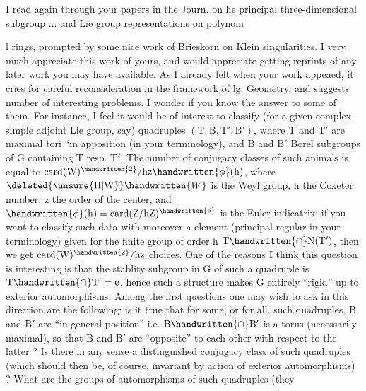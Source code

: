 I read again through your papers in the  Journ. on he principal three-dimensional subgroup ... and Lie group representations on polynoml rings, prompted by some nice work of Brieskorn on Klein singularities. I very much appreciate this work of yours, and would appreciate getting reprints of any later work you may have available. As I already felt when your work appeaed, it cries for careful reconsideration in the framework of lg. Geometry, and suggests number of interesting problems. I wonder if you know the answer to some of them. For instance, I feel it would be of interest to classify (for a given complex simple adjoint Lie group, say) quadruples $(\mathrm{T},\mathrm{B},\mathrm{T}',\mathrm{B}')$, where $\mathrm{T}$ and $\mathrm{T}'$ are maximal tori ``in apposition (in your terminology), and $\mathrm{B}$ and $\mathrm{B}'$ Borel subgroups of $\mathrm{G}$ containing $\mathrm{T}$ resp. $\mathrm{T}'$. The number of conjugacy classes of such animals is equal to $\operatorname{card}(\mathrm{W})^{\handwritten{2}}/\mathrm{hz}\handwritten{\phi}(\mathrm{h})$, where $\deleted{\unsure{\mathrm{H}|\mathrm{W}}}\handwritten{W}$ is the Weyl group, $\mathrm{h}$ the Coxeter number, $\mathrm{z}$ the order of the center, and $\handwritten{\phi}(\mathrm{h})=\operatorname{card}(\underline{\mathrm{Z}}/\mathrm{h}\underline{\mathrm{Z}})^{\handwritten{*}}$ is the Euler indicatrix; if you want to classify such data with moreover a  element (principal regular in your terminology) given for the finite group of order $\mathrm{h}$ $\mathrm{T}\handwritten{\cap}\mathrm{N}(\mathrm{T}')$, then we get $\operatorname{card}(\mathrm{W})^{\handwritten{2}}/\mathrm{hz}$ choices. One of the reasons I think this question is interesting is that the stablity subgroup in $\mathrm{G}$ of such a quadruple is $\mathrm{T}\handwritten{\cap}\mathrm{T}'=\mathrm{e}$,\handwritten{\textsuperscript{*}} hence such a structure makes $\mathrm{G}$ entirely ``rigid'' up to exterior automorphisms. Among the first questions one may wish to ask in this direction are the following: is it true that for some, or for all, such quadruples, $\mathrm{B}$ and $\mathrm{B}'$ are ``in general position'' i.e. $\mathrm{B}\handwritten{\cap}\mathrm{B}'$ is a torus (necessarily maximal), so that $\mathrm{B}$ and $\mathrm{B}'$ are ``opposite'' to each other with respect to the latter ? Is there in any sense a \uline{distinguished} conjugacy class of such quadruples (which should then be, of course, invariant by action of exterior automorphisms) ? What are the groups of automorphisms of such quadruples (they

